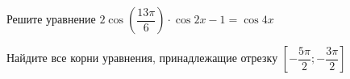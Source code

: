 \begin{ex}
	\begin{condition}
		\begin{enumcols}[label=\asbuk*)]
			\item Решите уравнение \( 2\cos  {\left(\dfrac{13\pi}{6}\right)}\cdot\cos 2x -1 = \cos 4x \)
			\item Найдите все корни уравнения, принадлежащие отрезку \( \left[-\dfrac{5\pi}{2};-\dfrac{3\pi}{2}\right]  \)
		\end{enumcols}
	\end{condition}
\end{ex}